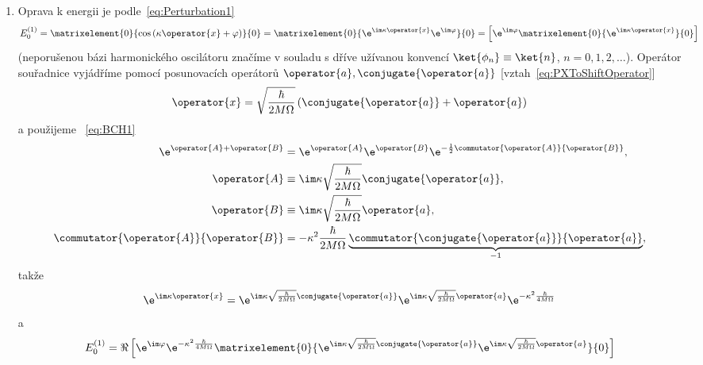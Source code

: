 \begin{solution}
	\begin{enumerate}
	\item
		Oprava k energii je podle~\eqref{eq:Perturbation1}
		\begin{equation}
			E_{0}^{(1)}
				=\matrixelement{0}{\cos\left(\kappa\operator{x}+\varphi\right)}{0}
				=\real\matrixelement{0}{\e^{\im\kappa\operator{x}}\e^{\im\varphi}}{0}
				=\real\left[\e^{\im\varphi}\matrixelement{0}{\e^{\im\kappa\operator{x}}}{0}\right]
		\end{equation}		
		(neporušenou bázi harmonického oscilátoru značíme v souladu s dříve užívanou konvencí $\ket{\phi_{n}}\equiv\ket{n}$, $n=0,1,2,\dotsc$).
		Operátor souřadnice vyjádříme pomocí posunovacích operátorů $\operator{a},\conjugate{\operator{a}}$ [vztah~\eqref{eq:PXToShiftOperator}]
		\begin{equation}
			\operator{x}=\sqrt{\frac{\hbar}{2M\Omega}}\left(\conjugate{\operator{a}}+\operator{a}\right)
		\end{equation}
		a použijeme ~\eqref{eq:BCH1}
        \begin{subequations}
            \begin{align}
                \e^{\operator{A}+\operator{B}}
                    &=\e^{\operator{A}}\e^{\operator{B}}\e^{-\frac{1}{2}\commutator{\operator{A}}{\operator{B}}},\\
                \operator{A}
                    &\equiv\im\kappa\sqrt{\frac{\hbar}{2M\Omega}}\conjugate{\operator{a}},\\
                \operator{B}
                    &\equiv\im\kappa\sqrt{\frac{\hbar}{2M\Omega}}\operator{a},\\
                \commutator{\operator{A}}{\operator{B}}
                    &=-\kappa^{2}\frac{\hbar}{2M\Omega}\underbrace{\commutator{\conjugate{\operator{a}}}{\operator{a}}}_{-1},\\
            \end{align}            
        \end{subequations}
		takže
		\begin{equation}
			\label{eq:HOPerturbedBCH}
			\e^{\im\kappa\operator{x}}
				=\e^{\im\kappa\sqrt{\frac{\hbar}{2M\Omega}}\conjugate{\operator{a}}}\e^{\im\kappa\sqrt{\frac{\hbar}{2M\Omega}}\operator{a}}\e^{-\kappa^{2}\frac{\hbar}{4M\Omega}}
		\end{equation}
		a 
		\begin{align}
			E_{0}^{(1)}
				&=\Re\left[\e^{\im\varphi}\e^{-\kappa^{2}\frac{\hbar}{4M\Omega}}\matrixelement{0}{\e^{\im\kappa\sqrt{\frac{\hbar}{2M\Omega}}\conjugate{\operator{a}}}\e^{\im\kappa\sqrt{\frac{\hbar}{2M\Omega}}\operator{a}}}{0}\right]\nonumber\\

\end{align}
\end{enumerate}
\end{solution}
